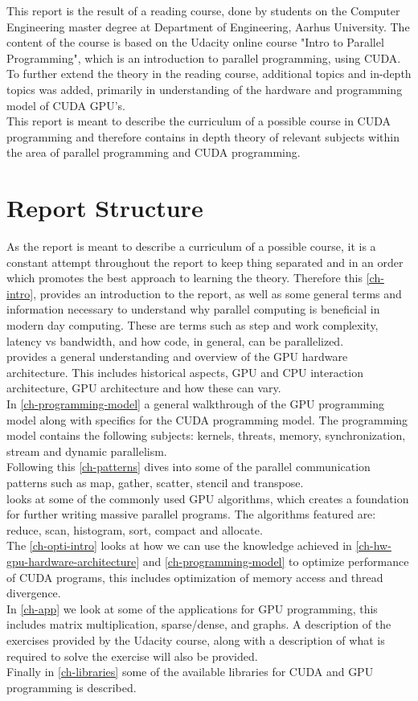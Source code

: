 This report is the result of a reading course, done by students on the Computer Engineering master degree at Department of Engineering, Aarhus University. The content of the course is based on the Udacity online course "Intro to Parallel Programming", which is an introduction to parallel programming, using CUDA. To further extend the theory in the reading course, additional topics and in-depth topics was added, primarily in understanding of the hardware and programming model of CUDA GPU's.\\
This report is meant to describe the curriculum of a possible course in CUDA programming and therefore contains in depth theory of relevant subjects within the area of parallel programming and CUDA programming.

\section{Report Structure}
\label{sec-rep-struc}
As the report is meant to describe a curriculum of a possible course, it is a constant attempt throughout the report to keep thing separated and in an order which promotes the best approach to learning the theory. Therefore this \cref{ch-intro}, provides an introduction to the report, as well as some general terms and information necessary to understand why parallel computing is beneficial in modern day computing. These are terms such as step and work complexity, latency vs bandwidth, and how code, in general, can be parallelized.\\
 provides a general understanding and overview of the GPU hardware architecture. This includes historical aspects, GPU and CPU interaction architecture, GPU architecture and how these can vary.\\
In \cref{ch-programming-model} a general walkthrough of the GPU programming model along with specifics for the CUDA programming model. The programming model contains the following subjects: kernels, threats, memory, synchronization, stream and dynamic parallelism.\\
Following this \cref{ch-patterns} dives into some of the parallel communication patterns such as map, gather, scatter, stencil and transpose.\\
 looks at some of the commonly used GPU algorithms, which creates a foundation for further writing massive parallel programs. The algorithms featured are: reduce, scan, histogram, sort, compact and allocate.\\
The \cref{ch-opti-intro} looks at how we can use the knowledge achieved in \cref{ch-hw-gpu-hardware-architecture} and \cref{ch-programming-model} to optimize performance of CUDA programs, this includes optimization of memory access and thread divergence.\\
In \cref{ch-app} we look at some of the applications for GPU programming, this includes matrix multiplication, sparse/dense, and graphs. A description of the exercises provided by the Udacity course, along with a description of what is required to solve the exercise will also be provided.\\
Finally in \cref{ch-libraries} some of the available libraries for CUDA and GPU programming is described.